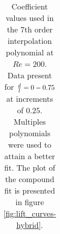 \begin{table}[!h]
\begin{center}
\begin{tabular}{c c c c c c}
          
  
  
\hline %


\end{tabular}

\caption{Coefficient values used in the 7th order interpolation polynomial at $Re=200$. Data present for $\frac{d}{l}=0-0.75$ at increments of $0.25$. Multiples polynomials were used to attain a better fit. The plot of the compound fit is presented in figure \ref{fig:lift_curves-hybrid}.} 
 
\label{table:cy-coefficients-hybrid} %
\end{center}
\end{table}

